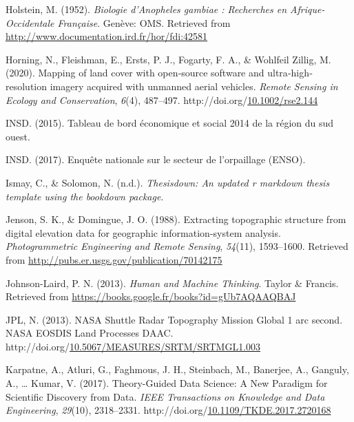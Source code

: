 \documentclass[12pt,twoside]{reedthesis}
\newlength{\cslhangindent}
\newenvironment{CSLReferences}[2] %
 {%
  \setlength{\parindent}{0pt}
  \ifodd #1 \everypar{\setlength{\hangindent}{\cslhangindent}}\ignorespaces\fi
  \ifnum #2 > 0
  \setlength{\parskip}{#2\baselineskip}
  \fi
 }%
 {}
\begin{document}
\begin{CSLReferences}{1}{0}
\leavevmode{}%
Holstein, M. (1952). \emph{Biologie d'{Anopheles} gambiae : Recherches en {Afrique}-{Occidentale} {Française}}. Genève: OMS. Retrieved from \url{http://www.documentation.ird.fr/hor/fdi:42581}

\leavevmode{}%
Horning, N., Fleishman, E., Ersts, P. J., Fogarty, F. A., \& Wohlfeil Zillig, M. (2020). Mapping of land cover with open‐source software and ultra‐high‐resolution imagery acquired with unmanned aerial vehicles. \emph{Remote Sensing in Ecology and Conservation}, \emph{6}(4), 487--497. http://doi.org/\href{https://doi.org/10.1002/rse2.144}{10.1002/rse2.144}

\leavevmode{}%
INSD. (2015). Tableau de bord économique et social 2014 de la région du sud ouest.

\leavevmode{}%
INSD. (2017). Enquête nationale sur le secteur de l'orpaillage (ENSO).

\leavevmode{}%
Ismay, C., \& Solomon, N. (n.d.). \emph{Thesisdown: An updated r markdown thesis template using the bookdown package}.

\leavevmode{}%
Jenson, S. K., \& Domingue, J. O. (1988). Extracting topographic structure from digital elevation data for geographic information-system analysis. \emph{Photogrammetric Engineering and Remote Sensing}, \emph{54}(11), 1593--1600. Retrieved from \url{http://pubs.er.usgs.gov/publication/70142175}

\leavevmode{}%
Johnson-Laird, P. N. (2013). \emph{Human and {Machine} {Thinking}}. Taylor \& Francis. Retrieved from \url{https://books.google.fr/books?id=gUb7AQAAQBAJ}

\leavevmode{}%
JPL, N. (2013). {NASA} {Shuttle} {Radar} {Topography} {Mission} {Global} 1 arc second. NASA EOSDIS Land Processes DAAC. http://doi.org/\href{https://doi.org/10.5067/MEASURES/SRTM/SRTMGL1.003}{10.5067/MEASURES/SRTM/SRTMGL1.003}

\leavevmode{}%
Karpatne, A., Atluri, G., Faghmous, J. H., Steinbach, M., Banerjee, A., Ganguly, A., \ldots{} Kumar, V. (2017). Theory-{Guided} {Data} {Science}: {A} {New} {Paradigm} for {Scientific} {Discovery} from {Data}. \emph{IEEE Transactions on Knowledge and Data Engineering}, \emph{29}(10), 2318--2331. http://doi.org/\href{https://doi.org/10.1109/TKDE.2017.2720168}{10.1109/TKDE.2017.2720168}


\end{CSLReferences}
\end{document}
